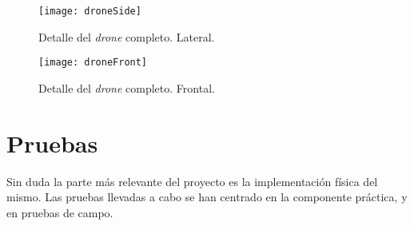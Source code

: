 \begin{figure}[H]
	\centering
	\texttt{[image: droneSide]}
	\caption[Lateral del \emph{drone}]{Detalle del \emph{drone} completo. Lateral.}\label{fig:droneSideView}
\end{figure}

\begin{figure}[H]
	\centering
	\texttt{[image: droneFront]}
	\caption[Frontal del \emph{drone}]{Detalle del \emph{drone} completo. Frontal.}\label{fig:droneFrontView}
\end{figure}


\section{Pruebas}
\label{sec:testing}
Sin duda la parte más relevante del proyecto es la implementación física del mismo. Las pruebas llevadas a cabo se han centrado en la componente práctica, y en pruebas de campo. 


